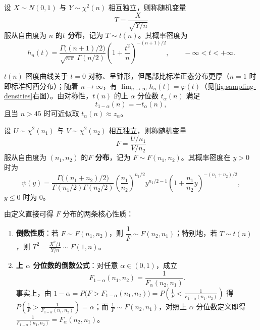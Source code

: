 \begin{definition}[$t$ 分布（学生氏分布）]
\label{def:t-distribution}
设 $X\sim N(0,1)$ 与 $Y\sim\chi^2(n)$ 相互独立，则称随机变量
\begin{equation}
  T=\frac{X}{\sqrt{Y/n}}
  \label{eq:t-def}
\end{equation}
服从自由度为 $n$ 的\textbf{$t$ 分布}，记为 $T\sim t(n)$。其概率密度为
\begin{equation}
  h_n(t)=\frac{\Gamma\bigl((n+1)/2\bigr)}{\sqrt{n\pi}\,\Gamma(n/2)}\left(1+\frac{t^2}{n}\right)^{-(n+1)/2},\qquad -\infty<t<+\infty.
  \label{eq:t-density}
\end{equation}
\end{definition}

$t(n)$ 密度曲线关于 $t=0$ 对称、呈钟形，但尾部比标准正态分布更厚（$n=1$ 时即标准柯西分布）；随着 $n\to\infty$，有 $\lim_{n\to\infty}h_n(t)=\varphi(t)$（见\cref{fig:sampling-densities}右图）。由对称性，$t(n)$ 的上 $\alpha$ 分位数 $t_\alpha(n)$ 满足
\begin{equation}
  t_{1-\alpha}(n)=-t_\alpha(n),
  \label{eq:t-quantile-sym}
\end{equation}
且当 $n>45$ 时可近似取 $t_\alpha(n)\approx z_\alpha$。

\begin{definition}[$F$ 分布]
\label{def:f-distribution}
设 $U\sim\chi^2(n_1)$ 与 $V\sim\chi^2(n_2)$ 相互独立，则称随机变量
\begin{equation}
  F=\frac{U/n_1}{V/n_2}
  \label{eq:f-def}
\end{equation}
服从自由度为 $(n_1,n_2)$ 的\textbf{$F$ 分布}，记为 $F\sim F(n_1,n_2)$。其概率密度在 $y>0$ 时为
\begin{equation}
  \psi(y)=\frac{\Gamma\bigl((n_1+n_2)/2\bigr)}{\Gamma(n_1/2)\Gamma(n_2/2)}
  \left(\frac{n_1}{n_2}\right)^{n_1/2}
  y^{n_1/2-1}\left(1+\frac{n_1}{n_2}y\right)^{-(n_1+n_2)/2},
  \label{eq:f-density}
\end{equation}
$y\le 0$ 时为 $0$。
\end{definition}

由定义直接可得 $F$ 分布的两条核心性质：
\begin{enumerate}
  \item \textbf{倒数性质}：若 $F\sim F(n_1,n_2)$，则 $\dfrac{1}{F}\sim F(n_2,n_1)$；特别地，若 $T\sim t(n)$，则 $T^2=\frac{X^2/1}{Y/n}\sim F(1,n)$。
  \item \textbf{上 $\alpha$ 分位数的倒数公式}：对任意 $\alpha\in(0,1)$，成立
  \begin{equation}
    F_{1-\alpha}(n_1,n_2)=\frac{1}{F_\alpha(n_2,n_1)}.
    \label{eq:f-quantile-recip}
  \end{equation}
  事实上，由 $1-\alpha=P\bigl(F>F_{1-\alpha}(n_1,n_2)\bigr)=P\!\left(\frac{1}{F}<\frac{1}{F_{1-\alpha}(n_1,n_2)}\right)$ 得 $P\!\left(\frac{1}{F}>\frac{1}{F_{1-\alpha}(n_1,n_2)}\right)=\alpha$；而 $\frac{1}{F}\sim F(n_2,n_1)$，对照上 $\alpha$ 分位数定义即得 $\frac{1}{F_{1-\alpha}(n_1,n_2)}=F_\alpha(n_2,n_1)$。
\end{enumerate}

